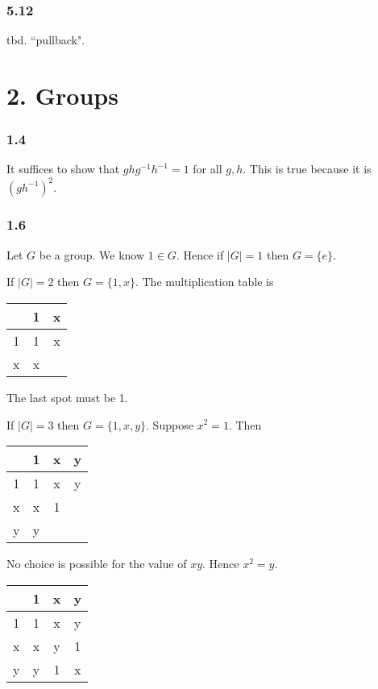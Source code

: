 \documentclass{article}
\begin{document}
\subsubsection*{5.12}

tbd. ``pullback".

\section*{2. Groups}

\subsubsection*{1.4}

It suffices to show that $ghg^{-1}h^{-1} = 1$ for all $g, h$. This is true because it is $(gh^{-1})^2$.

\subsubsection*{1.6}

Let $G$ be a group. We know $1 \in G$. Hence if $|G| = 1$ then $G = \{e\}$.

If $|G| = 2$ then $G = \{1, x\}$. The multiplication table is

\begin{tabular}{ c | c | c }
    & 1 & x \\ \hline
  1 & 1 & x \\ \hline
  x & x &   \\
\end{tabular}

The last spot must be 1.

If $|G| = 3$ then $G = \{1, x, y\}$. Suppose $x^2 = 1$. Then

\begin{tabular}{ c | c | c | c }
    & 1 & x & y \\ \hline
  1 & 1 & x & y \\ \hline
  x & x & 1 &   \\ \hline
  y & y &   &   \\
\end{tabular}

No choice is possible for the value of $xy$. Hence $x^2 = y$.

\begin{tabular}{ c | c | c | c }
    & 1 & x & y \\ \hline
  1 & 1 & x & y \\ \hline
  x & x & y & 1 \\ \hline
  y & y & 1 & x \\
\end{tabular}
\end{document}

